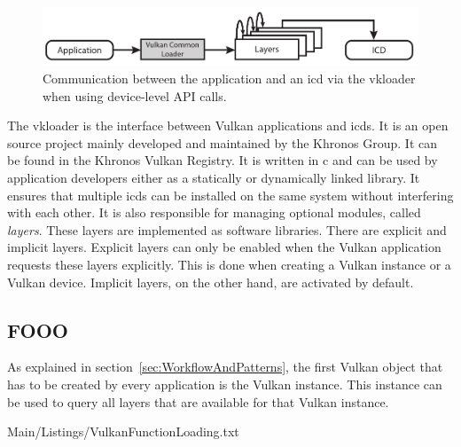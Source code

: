     \begin{figure}
      \includegraphics{Main/Images/VulkanLoaderDeviceLayers}
      \centering
      \caption{Communication between the application and an \gls{icd} via the \gls{vkloader} when using device-level API calls.}
      \label{fig:VulkanLoaderWithDeviceLayers}
    \end{figure}

    The \gls{vkloader} is the interface between Vulkan applications and \glspl{icd}.
    It is an open source project mainly developed and maintained by the Khronos Group.
    It can be found in the Khronos Vulkan Registry\cite{vulkanregistry}.
    It is written in \gls{c} and can be used by application developers either as a statically or dynamically linked library.
    It ensures that multiple \glspl{icd} can be installed on the same system without interfering with each other.
    It is also responsible for managing optional modules, called \textit{layers}.
    These layers are implemented as software libraries.
    There are explicit and implicit layers.
    Explicit layers can only be enabled when the Vulkan application requests these layers explicitly.
    This is done when creating a Vulkan instance or a Vulkan device.
    Implicit layers, on the other hand, are activated by default.

    \subsection{FOOO}

    As explained in section~\ref{sec:WorkflowAndPatterns}, the first Vulkan object that has to be created by every application is the Vulkan instance.
    This instance can be used to query all layers that are available for that Vulkan instance.

    
    {Main/Listings/VulkanFunctionLoading.txt}

